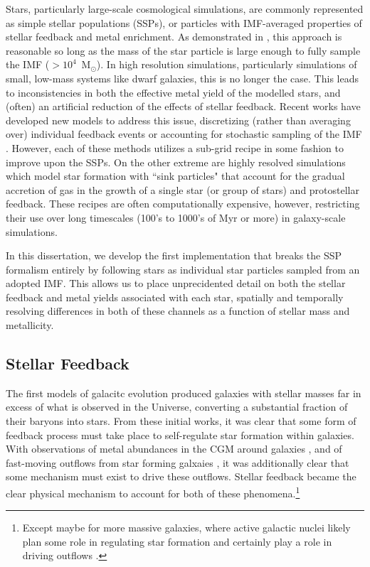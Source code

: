 Stars, particularly large-scale cosmological simulations, are commonly represented as simple stellar populations (SSPs), or particles with IMF-averaged properties of stellar feedback and metal enrichment. As demonstrated in \cite{Revaz2016}, this approach is reasonable so long as the mass of the star particle is large enough to fully sample the IMF ($> 10^{4}$~M$_{\odot}$). In high resolution simulations, particularly simulations of small, low-mass systems like dwarf galaxies, this is no longer the case. This leads to inconsistencies in both the effective metal yield of the modelled stars, and (often) an artificial reduction of the effects of stellar feedback. Recent works have developed new models to address this issue, discretizing (rather than averaging over) individual feedback events \citep[e.g.][]{MUGS2010,FIRE,Hopkins2018,Rosdahl2018} or accounting for stochastic sampling of the IMF \citep{Hu2016,Hu2017,Applebaum2018,Su2018}. However, each of these methods utilizes a sub-grid recipe in some fashion to improve upon the SSPs. On the other extreme are highly resolved simulations which model star formation with ``sink particles" \citep[see for example ][]{Krumholz2004,Federrath2010,GongOstriker2013,BleulerTeyssier2014,Sormani2017} that account for the gradual accretion of gas in the growth of a single star (or group of stars) and protostellar feedback. These recipes are often computationally expensive, however, restricting their use over long timescales (100's to 1000's of Myr or more) in galaxy-scale simulations.

In this dissertation, we develop the first implementation that breaks the SSP formalism entirely by following stars as individual star particles sampled from an adopted IMF. This allows us to place unprecidented detail on both the stellar feedback and metal yields associated with each star, spatially and temporally resolving differences in both of these channels as a function of stellar mass and metallicity.

\subsection{Stellar Feedback} \label{intro:sec:feedback}

The first models of galacitc evolution produced galaxies with stellar masses far in excess of what is observed in the Universe, converting a substantial fraction of their baryons into stars. From these initial works, it was clear that some form of feedback process must take place to self-regulate star formation within galaxies. With observations of metal abundances in the CGM around galaxies \citep[see][ for a recent review]{Tumlinson2017}, and of fast-moving outflows from star forming galxaies \citep[see][ for a review]{Veilleux2005}, it was additionally clear that some mechanism must exist to drive these outflows. Stellar feedback became the clear physical mechanism to account for both of these phenomena.\footnote{Except maybe for more massive galaxies, where active galactic nuclei likely plan some role in regulating star formation and certainly play a role in driving outflows \citep[e.g.][]{Fabian2012}.}

